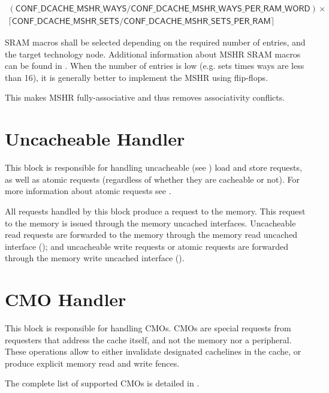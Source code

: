 \documentclass[10pt,titlepage,twoside]{book}
\begin{document}
\begin{equation*}
\begin{split}
\mathsf{(CONF\_DCACHE\_MSHR\_WAYS/CONF\_DCACHE\_MSHR\_WAYS\_PER\_RAM\_WORD)\times} \\
\mathsf{\lceil{}CONF\_DCACHE\_MSHR\_SETS/CONF\_DCACHE\_MSHR\_SETS\_PER\_RAM{}\rceil}
\end{split}
\end{equation*}

SRAM macros shall be selected depending on the required number of entries, and the target technology node. Additional information about \ac{MSHR} SRAM macros can be found in .
When the number of entries is low (e.g. sets times ways are less than 16), it is generally better to implement the \ac{MSHR} using flip-flops.

This makes \ac{MSHR} fully-associative and thus removes associativity conflicts.


\section{Uncacheable Handler}

This block is responsible for handling uncacheable (see ) load and store requests, as well as atomic requests (regardless of whether they are cacheable or not).
For more information about atomic requests see .

All requests handled by this block produce a request to the memory.
This request to the memory is issued through the memory uncached interfaces.
Uncacheable read requests are forwarded to the memory through the memory read uncached interface ();
and uncacheable write requests or atomic requests are forwarded through the memory write uncached interface ().


\section{\acf{CMO} Handler}

This block is responsible for handling \acp{CMO}.
\acp{CMO} are special requests from requesters that address the cache itself, and not the memory nor a peripheral.
These operations allow to either invalidate designated cachelines in the cache, or produce explicit memory read and write fences.

The complete list of supported \acp{CMO} is detailed in .
\end{document}
